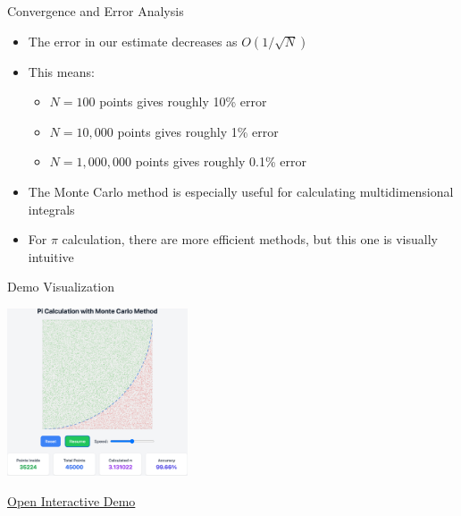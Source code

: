 \begin{frame}{Convergence and Error Analysis}
  \begin{itemize}
    \item The error in our estimate decreases as $O(1/\sqrt{N})$
    \item This means:
          \begin{itemize}
            \item $N=100$ points gives roughly 10\% error
            \item $N=10,000$ points gives roughly 1\% error
            \item $N=1,000,000$ points gives roughly 0.1\% error
          \end{itemize}
    \item The Monte Carlo method is especially useful for calculating multidimensional integrals
    \item For $\pi$ calculation, there are more efficient methods, but this one is visually intuitive
  \end{itemize}
\end{frame}

\begin{frame}{Demo Visualization}
\begin{center}
\includegraphics[width=0.4\textwidth]{../programs/pi_calculation/pi_calculation.png}

    \vspace{0.5cm}
    \href{../programs/pi_calculation/pi_calculation.html}{Open Interactive Demo}
    \end{center}
\end{frame}
